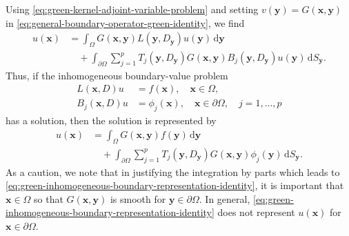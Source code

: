 Using \eqref{eq:green-kernel-adjoint-variable-problem} and setting $v(\bm{y})=G(\bm{x},\bm{y})$ in \eqref{eq:general-boundary-operator-green-identity}, we find
\begin{equation}\label{eq:green-inhomogeneous-boundary-representation-identity}
\begin{aligned}
u(\bm{x})&=\int_\Omega G(\bm{x},\bm{y})L(\bm{y},D_{\bm{y}})u(\bm{y})\,\mathrm{d}\bm{y}\\
&\quad+\int_{\partial\Omega}\sum_{j=1}^p T_j(\bm{y},D_{\bm{y}})G(\bm{x},\bm{y})B_j(\bm{y},D_{\bm{y}})u(\bm{y})\,\mathrm{d}S_{\bm{y}}.
\end{aligned}
\end{equation}
Thus, if the inhomogeneous boundary-value problem
\begin{equation}\label{eq:general-inhomogeneous-boundary-value-problem}
\begin{aligned}
L(\bm{x},D)u&=f(\bm{x}),\quad\bm{x}\in\Omega,\\
B_j(\bm{x},D)u&=\phi_j(\bm{x}),\quad\bm{x}\in\partial\Omega,\quad j=1,\ldots,p
\end{aligned}
\end{equation}
has a solution, then the solution is represented by
\begin{equation}\label{eq:green-general-inhomogeneous-solution-formula}
\begin{aligned}
u(\bm{x})&=\int_\Omega G(\bm{x},\bm{y})f(\bm{y})\,\mathrm{d}\bm{y}\\
&\quad+\int_{\partial\Omega}\sum_{j=1}^p T_j(\bm{y},D_{\bm{y}})G(\bm{x},\bm{y})\phi_j(\bm{y})\,\mathrm{d}S_{\bm{y}}.
\end{aligned}
\end{equation}
As a caution, we note that in justifying the integration by parts which leads to \eqref{eq:green-inhomogeneous-boundary-representation-identity}, it is important that $\bm{x}\in\Omega$ so that $G(\bm{x},\bm{y})$ is smooth for $\bm{y}\in\partial\Omega$. In general, \eqref{eq:green-inhomogeneous-boundary-representation-identity} does not represent $u(\bm{x})$ for $\bm{x}\in\partial\Omega$.

